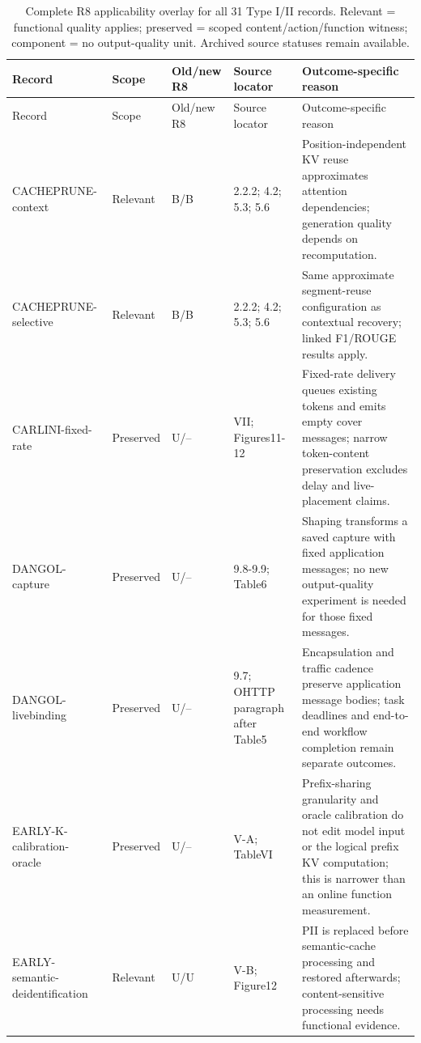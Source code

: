 \begingroup\footnotesize\setlength{\tabcolsep}{3pt}
\begin{longtable}{@{}p{}p{}p{}p{}p{}@{}}
\caption{Complete R8 applicability overlay for all 31 Type I/II records. Relevant = functional quality applies; preserved = scoped content/action/function witness; component = no output-quality unit. Archived source statuses remain available.}\label{tab:r41-utility-records}\\
\toprule Record & Scope & Old/new R8 & Source locator & Outcome-specific reason\\\midrule\endfirsthead
\toprule Record & Scope & Old/new R8 & Source locator & Outcome-specific reason\\\midrule\endhead
CACHEPRUNE-\allowbreak{}context~\cite{wu2026cacheprune} & Relevant & B/B & 2.2.2; 4.2; 5.3; 5.6 & Position-independent KV reuse approximates attention dependencies; generation quality depends on recomputation.\\
CACHEPRUNE-\allowbreak{}selective~\cite{wu2026cacheprune} & Relevant & B/B & 2.2.2; 4.2; 5.3; 5.6 & Same approximate segment-reuse configuration as contextual recovery; linked F1/ROUGE results apply.\\
CARLINI-\allowbreak{}fixed-\allowbreak{}rate~\cite{carlini2024remote} & Preserved & U/-- & VII; Figures11-12 & Fixed-rate delivery queues existing tokens and emits empty cover messages; narrow token-content preservation excludes delay and live-placement claims.\\
DANGOL-\allowbreak{}capture~\cite{dangol2026workflow} & Preserved & U/-- & 9.8-9.9; Table6 & Shaping transforms a saved capture with fixed application messages; no new output-quality experiment is needed for those fixed messages.\\
DANGOL-\allowbreak{}livebinding~\cite{dangol2026workflow} & Preserved & U/-- & 9.7; OHTTP paragraph after Table5 & Encapsulation and traffic cadence preserve application message bodies; task deadlines and end-to-end workflow completion remain separate outcomes.\\
EARLY-\allowbreak{}K-\allowbreak{}calibration-\allowbreak{}oracle~\cite{earlybird2025} & Preserved & U/-- & V-A; TableVI & Prefix-sharing granularity and oracle calibration do not edit model input or the logical prefix KV computation; this is narrower than an online function measurement.\\
EARLY-\allowbreak{}semantic-\allowbreak{}deidentification~\cite{earlybird2025} & Relevant & U/U & V-B; Figure12 & PII is replaced before semantic-cache processing and restored afterwards; content-sensitive processing needs functional evidence.\\

\end{longtable}
